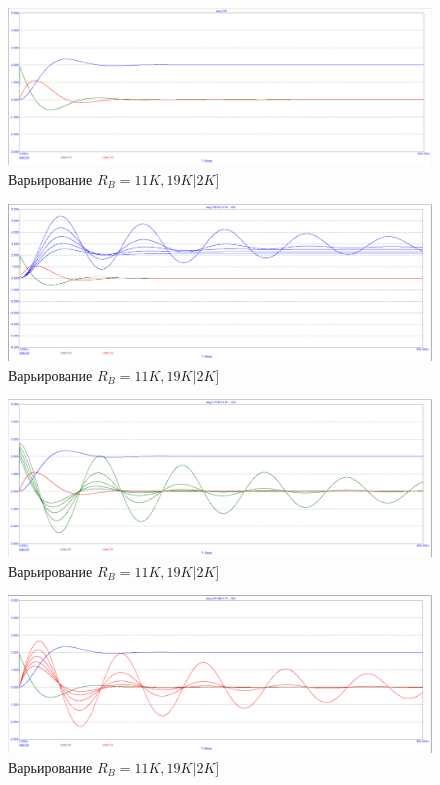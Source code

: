 \documentclass[15pt,a5paper,reqno]{article}
\begin{document}
\begin{figure}[h!]
    \centering
    \includegraphics[width=12cm]{pics/point4_2.png}
    \caption{Варьирование $R_B  = 11K, 19K | 2K]$}
    \label{}
\end{figure}


\begin{figure}[h!]
    \centering
    \includegraphics[width=12cm]{pics/point4_2_var1.png}
    \caption{Варьирование $R_B  = 11K, 19K | 2K]$}
    \label{}
\end{figure}



\begin{figure}[h!]
    \centering
    \includegraphics[width=12cm]{pics/point4_2_var2.png}
    \caption{Варьирование $R_B  = 11K, 19K | 2K]$}
    \label{}
\end{figure}


\begin{figure}[h!]
    \centering
    \includegraphics[width=12cm]{pics/point4_2_var3.png}
    \caption{Варьирование $R_B  = 11K, 19K | 2K]$}
    \label{}
\end{figure}
\end{document}
